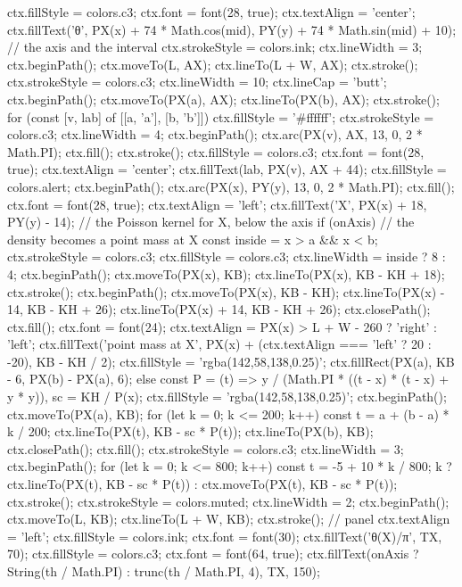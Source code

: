 \begin{js}
{{  ctx.fillStyle = colors.c3; ctx.font = font(28, true); ctx.textAlign = 'center';
  ctx.fillText('θ', PX(x) + 74 * Math.cos(mid), PY(y) + 74 * Math.sin(mid) + 10);
  }
  // the axis and the interval
  ctx.strokeStyle = colors.ink; ctx.lineWidth = 3; ctx.beginPath(); ctx.moveTo(L, AX); ctx.lineTo(L + W, AX); ctx.stroke();
  ctx.strokeStyle = colors.c3; ctx.lineWidth = 10; ctx.lineCap = 'butt'; ctx.beginPath(); ctx.moveTo(PX(a), AX); ctx.lineTo(PX(b), AX); ctx.stroke();
  for (const [v, lab] of [[a, 'a'], [b, 'b']]) {
    ctx.fillStyle = '#ffffff'; ctx.strokeStyle = colors.c3; ctx.lineWidth = 4; ctx.beginPath(); ctx.arc(PX(v), AX, 13, 0, 2 * Math.PI); ctx.fill(); ctx.stroke();
    ctx.fillStyle = colors.c3; ctx.font = font(28, true); ctx.textAlign = 'center'; ctx.fillText(lab, PX(v), AX + 44);
  }
  ctx.fillStyle = colors.alert; ctx.beginPath(); ctx.arc(PX(x), PY(y), 13, 0, 2 * Math.PI); ctx.fill();
  ctx.font = font(28, true); ctx.textAlign = 'left'; ctx.fillText('X', PX(x) + 18, PY(y) - 14);
  // the Poisson kernel for X, below the axis
  if (onAxis) {
    // the density becomes a point mass at X
    const inside = x > a && x < b;
    ctx.strokeStyle = colors.c3; ctx.fillStyle = colors.c3; ctx.lineWidth = inside ? 8 : 4;
    ctx.beginPath(); ctx.moveTo(PX(x), KB); ctx.lineTo(PX(x), KB - KH + 18); ctx.stroke();
    ctx.beginPath(); ctx.moveTo(PX(x), KB - KH); ctx.lineTo(PX(x) - 14, KB - KH + 26); ctx.lineTo(PX(x) + 14, KB - KH + 26); ctx.closePath(); ctx.fill();
    ctx.font = font(24); ctx.textAlign = PX(x) > L + W - 260 ? 'right' : 'left'; ctx.fillText('point mass at X', PX(x) + (ctx.textAlign === 'left' ? 20 : -20), KB - KH / 2);
    ctx.fillStyle = 'rgba(142,58,138,0.25)'; ctx.fillRect(PX(a), KB - 6, PX(b) - PX(a), 6);
  } else {
    const P = (t) => y / (Math.PI * ((t - x) * (t - x) + y * y)), sc = KH / P(x);
    ctx.fillStyle = 'rgba(142,58,138,0.25)'; ctx.beginPath(); ctx.moveTo(PX(a), KB);
    for (let k = 0; k <= 200; k++) { const t = a + (b - a) * k / 200; ctx.lineTo(PX(t), KB - sc * P(t)); }
    ctx.lineTo(PX(b), KB); ctx.closePath(); ctx.fill();
    ctx.strokeStyle = colors.c3; ctx.lineWidth = 3; ctx.beginPath();
    for (let k = 0; k <= 800; k++) { const t = -5 + 10 * k / 800; k ? ctx.lineTo(PX(t), KB - sc * P(t)) : ctx.moveTo(PX(t), KB - sc * P(t)); }
    ctx.stroke();
  }
  ctx.strokeStyle = colors.muted; ctx.lineWidth = 2; ctx.beginPath(); ctx.moveTo(L, KB); ctx.lineTo(L + W, KB); ctx.stroke();
  // panel
  ctx.textAlign = 'left'; ctx.fillStyle = colors.ink; ctx.font = font(30);
  ctx.fillText('θ(X)/π', TX, 70);
  ctx.fillStyle = colors.c3; ctx.font = font(64, true); ctx.fillText(onAxis ? String(th / Math.PI) : trunc(th / Math.PI, 4), TX, 150);
}
\end{js}
